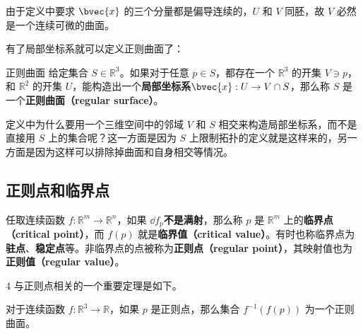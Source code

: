 由于定义中要求 $\bvec{x}$ 的三个分量都是偏导连续的，$U$ 和 $V$ 同胚，故 $V$ 必然是一个连续可微的曲面。

有了局部坐标系就可以定义正则曲面了：

\begin{definition}{正则曲面}
给定集合 $S\in\mathbb{R}^3$。如果对于任意 $p\in S$，都存在一个 $\mathbb{R}^3$ 的开集 $V\ni p$，和 $\mathbb{R}^2$ 的开集 $U$，能构造出一个\textbf{局部坐标系}$\bvec{x}:U\to V\cap S$，那么称 $S$ 是一个\textbf{正则曲面（regular surface）}。
\end{definition}

定义中为什么要用一个三维空间中的邻域 $V$ 和 $S$ 相交来构造局部坐标系，而不是直接用 $S$ 上的集合呢？这一方面是因为 $S$ 上限制拓扑的定义就是这样来的，另一方面是因为这样可以排除掉曲面和自身相交等情况。

\subsection{正则点和临界点}

\begin{definition}{}
任取连续函数 $f:\mathbb{R}^m\to\mathbb{R}^n$，如果 $\dd f_p$\textbf{不是满射}，那么称 $p$ 是 $\mathbb{R}^m$ 上的\textbf{临界点（critical point）}，而 $f(p)$ 就是\textbf{临界值（critical value）}。有时也称临界点为\textbf{驻点}、\textbf{稳定点}等。非临界点的点被称为\textbf{正则点（regular point）}，其映射值也为\textbf{正则值（regular value）}。
\end{definition}
4
与正则点相关的一个重要定理是如下。

\begin{theorem}{}
对于连续函数 $f:\mathbb{R}^3\to\mathbb{R}$，如果 $p$ 是正则点，那么集合 $f^{-1}(f(p))$ 为一个正则曲面。
\end{theorem}


